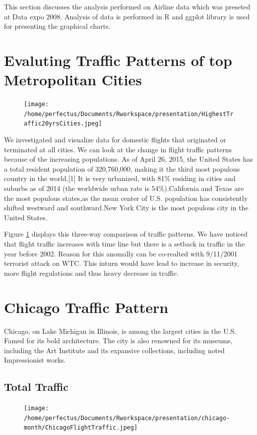 This section discusses the analysis performed on Airline data which was preseted at Data expo 2008. Analysis of data is performed in R and ggplot library is used for presenting the graphical charts.

\section{Evaluting Traffic Patterns of top Metropolitan Cities}\begin{figure}[htp]
\centering
\texttt{[image: /home/perfectus/Documents/Rworkspace/presentation/HighestTraffic20yrsCities.jpeg]}
\caption{}
\label{fig1}
\end{figure}

We investigated and visualize data for domestic flights that originated or terminated at all cities. We can look at the change in flight traffic patterns because of the increasing populations.
As of April 26, 2015, the United States has a total resident population of 320,760,000, making it the third most populous country in the world.[1] It is very urbanized, with 81\% residing in cities and suburbs as of 2014 (the worldwide urban rate is 54\%).California and Texas are the most populous states,as the mean center of U.S. population has consistently shifted westward and southward.New York City is the most populous city in the United States.

Figure \ref{fig1} displays this three-way comparison of traffic patterns. We have noticed that flight traffic increases with time line but there is a setback in traffic in the year before 2002. Reason for this anomally can be co-realted with 9/11/2001 terrorist attack on WTC. This inturn would have lead to increase in security, more flight regulations and thus heavy decrease in traffic.

\section{Chicago Traffic Pattern}
Chicago, on Lake Michigan in Illinois, is among the largest cities in the U.S. Famed for its bold architecture. The city is also renowned for its museums, including the Art Institute and its expansive collections, including noted Impressionist works.
\subsection{Total Traffic }
\begin{figure}[htp]
\centering
\texttt{[image: /home/perfectus/Documents/Rworkspace/presentation/chicago-month/ChicagoFlightTraffic.jpeg]}
\caption{}
\label{chicago:fig1}
\end{figure}

